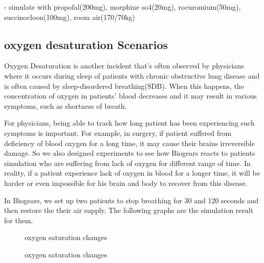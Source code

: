 \documentclass[a4paper]{article}
\begin{document}
- simulate with propofal(200mg), morphine so4(20mg), rocuromium(50mg), succinocloon(100mg), room air(170/70kg)

\subsection{oxygen desaturation Scenarios}

Oxygen Desaturation is another incident that's often observed by physicians where it occurs during sleep of patients with chronic obstructive lung disease and is often caused by sleep-disordered breathing(SDB)\cite{low_oxygen_sleep}. When this happens, the concentration of oxygen in patients' blood decreases and it may result in various symptoms, such as shortness of breath.

For physicians, being able to track how long patient has been experiencing such symptoms is important. For example, in surgery, if patient suffered from deficiency of blood oxygen for a long time, it may cause their brains irreversible damage. So we also designed experiments to see how Biogears reacts to patients simulation who are suffering from lack of oxygen for different range of time. In reality, if a patient experience lack of oxygen in blood for a longer time, it will be harder or even impossible for his brain and body to recover from this disease.

In Biogears, we set up two patients to stop breathing for 30 and 120 seconds and then restore the their air supply. The following graphs are the simulation result for them.

\begin{figure}[!htb]\centering
   \begin{minipage}{0.49\textwidth}
     \caption{oxygen saturation changes}
     \label{fig:patient stoping breathing}
     
   \end{minipage}
   \begin {minipage}{0.49\textwidth}
     \caption{oxygen saturation changes}
     \label{fig:patient stoping breathing}
   \end{minipage}
\end{figure}
\end{document}
